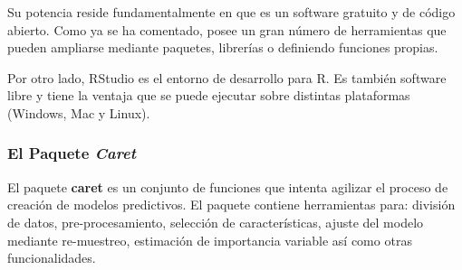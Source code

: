 Su potencia reside fundamentalmente en que es un software gratuito y de código abierto. Como ya se ha comentado, posee un gran número de herramientas que pueden ampliarse mediante paquetes, librerías o definiendo funciones propias.

Por otro lado, RStudio es el entorno de desarrollo para R. Es también software libre y tiene la ventaja que se puede ejecutar sobre distintas plataformas (Windows, Mac y Linux).

\subsubsection{El Paquete \textit{Caret}}

El paquete \textbf{caret} es un conjunto de funciones que intenta agilizar el proceso de creación de modelos predictivos. El paquete contiene herramientas para: división de datos, pre-procesamiento, selección de características, ajuste del modelo mediante re-muestreo, estimación de importancia variable así como otras funcionalidades. \cite{CARET2019}




